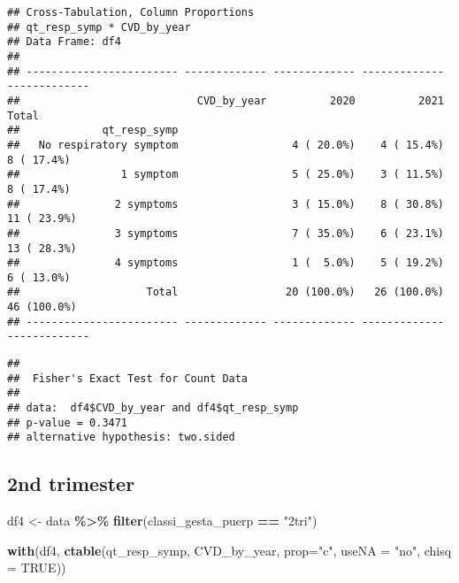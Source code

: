 \documentclass[
]{article}
\newenvironment{Shaded}{\begin{snugshade}}{\end{snugshade}}
\newcommand{\AttributeTok}[1]{\textcolor[rgb]{0.13,0.29,0.53}{#1}}
\newcommand{\ConstantTok}[1]{\textcolor[rgb]{0.56,0.35,0.01}{#1}}
\newcommand{\FunctionTok}[1]{\textcolor[rgb]{0.13,0.29,0.53}{\textbf{#1}}}
\newcommand{\NormalTok}[1]{#1}
\newcommand{\OtherTok}[1]{\textcolor[rgb]{0.56,0.35,0.01}{#1}}
\newcommand{\SpecialCharTok}[1]{\textcolor[rgb]{0.81,0.36,0.00}{\textbf{#1}}}
\newcommand{\StringTok}[1]{\textcolor[rgb]{0.31,0.60,0.02}{#1}}
\begin{document}
\begin{verbatim}
## Cross-Tabulation, Column Proportions  
## qt_resp_symp * CVD_by_year  
## Data Frame: df4  
## 
## ------------------------ ------------- ------------- ------------- -------------
##                            CVD_by_year          2020          2021         Total
##             qt_resp_symp                                                        
##   No respiratory symptom                  4 ( 20.0%)    4 ( 15.4%)    8 ( 17.4%)
##                1 symptom                  5 ( 25.0%)    3 ( 11.5%)    8 ( 17.4%)
##               2 symptoms                  3 ( 15.0%)    8 ( 30.8%)   11 ( 23.9%)
##               3 symptoms                  7 ( 35.0%)    6 ( 23.1%)   13 ( 28.3%)
##               4 symptoms                  1 (  5.0%)    5 ( 19.2%)    6 ( 13.0%)
##                    Total                 20 (100.0%)   26 (100.0%)   46 (100.0%)
## ------------------------ ------------- ------------- ------------- -------------
\end{verbatim}

\begin{Shaded}
\end{Shaded}

\begin{verbatim}
## 
##  Fisher's Exact Test for Count Data
## 
## data:  df4$CVD_by_year and df4$qt_resp_symp
## p-value = 0.3471
## alternative hypothesis: two.sided
\end{verbatim}

\hypertarget{nd-trimester-4}{%
\subsection{2nd trimester}\label{nd-trimester-4}}

\begin{Shaded}
\begin{Highlighting}[]
\NormalTok{df4 }\OtherTok{\textless{}{-}}\NormalTok{ data }\SpecialCharTok{\%\textgreater{}\%} 
  \FunctionTok{filter}\NormalTok{(classi\_gesta\_puerp }\SpecialCharTok{==} \StringTok{"2tri"}\NormalTok{)}

\FunctionTok{with}\NormalTok{(df4, }\FunctionTok{ctable}\NormalTok{(qt\_resp\_symp, CVD\_by\_year, }\AttributeTok{prop=}\StringTok{"c"}\NormalTok{, }\AttributeTok{useNA =} \StringTok{"no"}\NormalTok{, }\AttributeTok{chisq =} \ConstantTok{TRUE}\NormalTok{))}
\end{Highlighting}
\end{Shaded}
\end{document}
